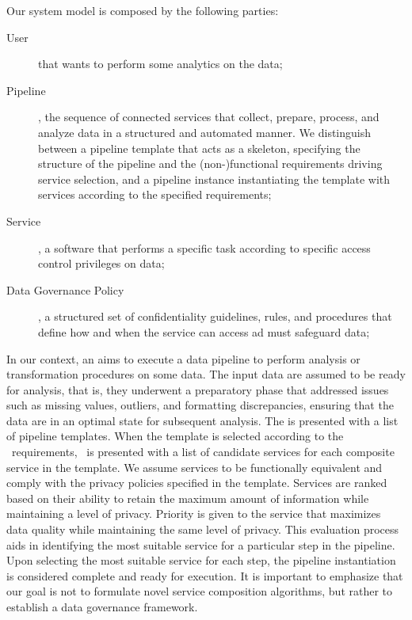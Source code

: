 Our system model is composed by the following parties:
\begin{description}
  \item[User] that wants to perform some analytics on the data;
  \item[Pipeline], the sequence of connected services that collect, prepare, process, and analyze data  in a structured and automated manner. We distinguish between a pipeline template that acts as a skeleton, specifying the structure of the pipeline and the (non-)functional requirements driving  service selection, and a pipeline instance instantiating the template with services according to the specified requirements;
  \item[Service], a software that performs a specific task according to specific access control privileges on data; %
  \item[Data Governance Policy], a structured set of confidentiality guidelines, rules, and procedures that define how and when the service can access ad must safeguard data;
\end{description}


In our context, an \user aims to execute a data pipeline to perform analysis or transformation procedures on some data.
The input data are assumed to be ready for analysis, that is, they underwent a preparatory phase that addressed issues such as missing values, outliers, and formatting discrepancies, ensuring that the data are in an optimal state for subsequent analysis.
The \user is presented with a list of pipeline templates. When the template is selected according to the \user\ requirements, \user\ is presented with a list of candidate services for each composite service in the template. We assume services to be functionally equivalent and comply with the privacy policies specified in the template.
Services are ranked based on their ability to retain the maximum amount of information while maintaining a level of privacy.
Priority is given to the service that maximizes data quality while maintaining the same level of privacy.
This evaluation process aids in identifying the most suitable service for a particular step in the pipeline.
Upon selecting the most suitable service for each step, the pipeline instantiation is considered complete and ready for execution.
It is important to emphasize that our goal is not to formulate novel service composition algorithms, but rather to establish a data governance framework.

